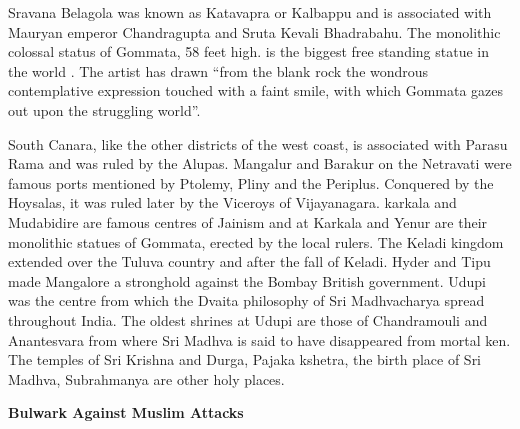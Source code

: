 \documentclass{book}
\begin{document}
Sravana Belagola was known as Katavapra or Kalbappu and is associated
with Mauryan emperor Chandragupta and Sruta Kevali Bhadrabahu. The
monolithic colossal status of Gommata, 58 feet high. is the biggest
free standing statue in the world . The artist has drawn ``from the
blank rock the wondrous contemplative expression touched with a faint
smile, with which Gommata gazes out upon the struggling world''.

South Canara, like the other districts of the west coast, is
associated with Parasu Rama and was ruled by the Alupas. Mangalur and
Barakur on the Netravati were famous ports mentioned by Ptolemy, Pliny
and the Periplus. Conquered by the Hoysalas, it was ruled later by the
Viceroys of Vijayanagara. karkala and Mudabidire are famous centres of
Jainism and at Karkala and Yenur are their monolithic statues of
Gommata, erected by the local rulers. The Keladi kingdom extended over
the Tuluva country and after the fall of Keladi. Hyder and Tipu made
Mangalore a stronghold against the Bombay British government. Udupi
was the centre from which the Dvaita philosophy of Sri Madhvacharya
spread throughout India. The oldest shrines at Udupi are those of
Chandramouli and Anantesvara from where Sri Madhva is said to have
disappeared from mortal ken. The temples of Sri Krishna and Durga,
Pajaka kshetra, the birth place of Sri Madhva, Subrahmanya are other
holy places.

\begin{center}
{\bf Bulwark Against Muslim Attacks}
\end{center}
\end{document}
